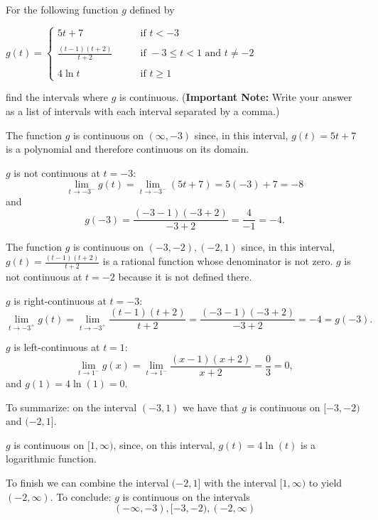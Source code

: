 \documentclass[nooutcomes, handout]{ximera}
\begin{document}
\begin{problem}
For the following function $g$ defined by
	
	$g(t) =   \left\{ \begin{array}{cl}
	5t + 7		 	&	\qquad \text{if } t < -3					\\ \\
	\frac{(t-1)(t+2)}{t+2}	&	\qquad \text{if } -3 \leq t < 1 \text{ and } t \neq -2	\\ \\
	4 \ln t				&	\qquad \text{if } t \geq 1					\end{array} \right.  $

  find the intervals where $g$ is continuous.  (\textbf{Important Note:} Write your answer as a list of intervals with each interval separated by a comma.)	

	\begin{freeResponse}
	The function $g$ is continuous on $(\infty, -3)$ since, in this interval, $g(t)=5t+7$ is a polynomial and therefore continuous on its domain.
  
  $g$ is not continuous at $t = -3$:
  \[
    \lim_{t \to -3^-} g(t) = \lim_{t \to -3^-} (5t+7) = 5(-3) + 7 = -8
  \]
  and
  \[
    g(-3) = \frac{(-3-1)(-3+2)}{-3+2} = \frac{4}{-1} = -4.
  \]

  The function $g$ is continuous on $(-3, -2),(-2,1)$ since, in this interval, $g(t) = \frac{(t-1)(t+2)}{t+2}$ is a rational function whose denominator is not zero. $g$ is not continuous at $t=-2$ because it is not defined there.

  $g$ is right-continuous at $t = -3$:
  \[
    \lim_{t \to -3^+} g(t) = \lim_{t \to -3^+} \frac{(t-1)(t+2)}{t+2} = \frac{(-3-1)(-3+2)}{-3+2} = -4 = g(-3).
  \]




  $g$ is left-continuous at $t = 1$:
  \[
    \lim_{t \to 1^-} g(x) = \lim_{t \to 1^-} \frac{(x-1)(x+2)}{x+2} = \frac{0}{3} = 0,
  \]
  and $g(1) = 4 \ln(1) = 0$.

  To summarize: on the interval $(-3, 1)$ we have that $g$ is continuous on $[-3, -2)$ and $(-2, 1]$.
  
  $g$ is continuous on $[1, \infty)$, since, on this interval, $g(t) =  4 \ln(t)$ is a logarithmic function.

  To finish we can combine the interval $(-2, 1]$ with the interval $[1, \infty)$ to yield $(-2, \infty)$.
  To conclude: $g$ is continuous on the intervals \[(-\infty, -3), [-3, -2), (-2, \infty)\]
  \end{freeResponse}
	
		
	
\end{problem}
	
\end{document}
